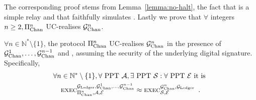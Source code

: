   The corresponding proof stems from
  Lemma~\ref{lemma:no-halt}, the fact that \fchan is a simple relay and that
  \simulator faithfully simulates \pchan. Lastly we prove that $\forall$
  integers $n \geq 2, \Pi_{\mathrm{Chan}}^{n}$ UC-realises $\mathcal{G}_{\mathrm{Chan}}^{n}$.

\begin{theorem}
  \label{theorem:security:virtual}
  $\forall n \in \mathbb{N}^* \setminus \{1\}$, the protocol $\Pi_{\mathrm{Chan}}^{n}$
  UC-realises $\mathcal{G}_{\mathrm{Chan}}^{n}$ in the presence of $\mathcal{G}_{\mathrm{Chan}}^{1}, \dots,
  \mathcal{G}_{\mathrm{Chan}}^{n-1}$ and \ledger, assuming the security of the underlying digital
  signature. Specifically,
  \begin{gather*}
    \forall n \in \mathbb{N}^* \setminus \{1\}, \forall \text{ PPT } \mathcal{A},
    \exists \text{ PPT } \mathcal{S}: \forall \text{ PPT } \mathcal{E} \text{ it
    is } \\
    \textsc{exec}^{\mathcal{G}_{\mathrm{Ledger}}, \mathcal{G}_{\mathrm{Chan}}^{1}, \dots, \mathcal{G}_{\mathrm{Chan}}^{n-1}}_{\Pi_{\mathrm{Chan}}^{n},
    \mathcal{A}, \mathcal{E}} \approx
    \textsc{exec}^{\mathcal{G}_{\mathrm{Chan}}^{n}, \mathcal{G}_{\mathrm{Ledger}}}_{\mathcal{S}, \mathcal{E}} \enspace.
  \end{gather*}
\end{theorem}
